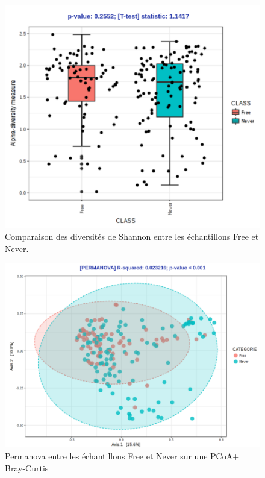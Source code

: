 \documentclass[12pt,a4paper]{article}
\begin{document}
{\begin{figure}[H]
\begin{center}
\includegraphics[scale=0.80]{img/compare.png}\hfill
\end{center}
\caption{Comparaison des diversités de Shannon entre les échantillons Free et Never.}
\label{compare}
\end{figure}


\begin{figure}[H]
\begin{center}
\includegraphics[scale=0.40]{img/pcoa.png}\hfill
\end{center}
\caption{Permanova entre les échantillons Free et Never sur une PCoA+ Bray-Curtis}
\label{pcoa}
\end{figure}

}
\end{document}
